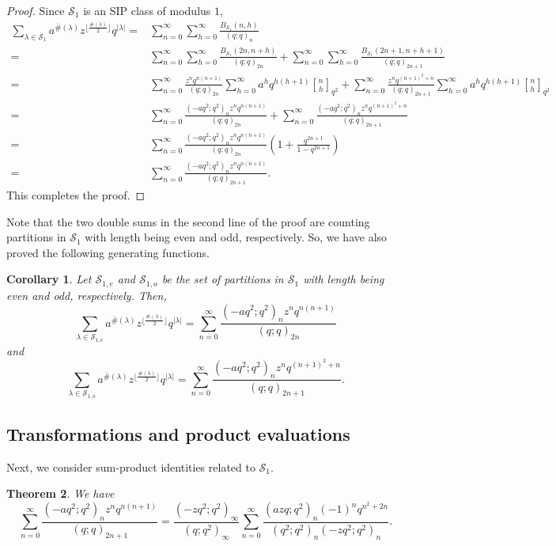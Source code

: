 \documentclass[11pt]{amsart}
\newtheorem{theorem}{Theorem}[section]
\newtheorem{cor}[theorem]{Corollary}
\theoremstyle{definition}
\theoremstyle{remark}
\numberwithin{equation}{section}
\begin{document}
\begin{proof}
Since $\mathcal{S}_1$ is an SIP class of modulus $1$,
\begin{align*}
\sum_{\lambda\in\mathcal{S}_1}a^{\overline{\#}(\lambda)}z^{\lfloor\frac{\#(\lambda)}{2}\rfloor}q^{|\lambda|}=&\sum_{n=0}^{\infty}\sum_{h=0}^{\infty}\frac{B_{\mathcal S_1}(n,h)}{(q;q)_{n}}\\
=&\sum_{n=0}^{\infty}\sum_{h=0}^{\infty}\frac{B_{\mathcal S_1}(2n,n+h)}{(q;q)_{2n}}+\sum_{n=0}^{\infty}\sum_{h=0}^{\infty}\frac{B_{\mathcal S_1}(2n+1,n+h+1)}{(q;q)_{2n+1}}\\
=&\sum_{n=0}^{\infty}\frac{z^nq^{n(n+1)}}{(q;q)_{2n}}\sum_{h=0}^{\infty}a^hq^{h(h+1)}{n\brack h}_{q^2}+\sum_{n=0}^{\infty}\frac{z^nq^{(n+1)^2+n}}{(q;q)_{2n+1}}\sum_{h=0}^{\infty}a^hq^{h(h+1)}{n\brack h}_{q^2}\\
=&\sum_{n=0}^{\infty}\frac{(-aq^2;q^2)_{n}z^nq^{n(n+1)}}{(q;q)_{2n}}+\sum_{n=0}^{\infty}\frac{(-aq^2;q^2)_{n}z^nq^{(n+1)^2+n}}{(q;q)_{2n+1}}\\
=&\sum_{n=0}^{\infty}\frac{(-aq^2;q^2)_{n}z^nq^{n(n+1)}}{(q;q)_{2n}}\left(1+\frac{q^{2n+1}}{1-q^{2n+1}}\right)\\
=&\sum_{n=0}^{\infty}\frac{(-aq^2;q^2)_{n}z^nq^{n(n+1)}}{(q;q)_{2n+1}}.
\end{align*}
This completes the proof.
\end{proof}
Note that the two double sums in the second line of the proof are counting partitions in $\mathcal{S}_1$ with length being even and odd, respectively. So, we have also proved the following generating functions.
\begin{cor}\label{cor:S1-evenodd}
Let $\mathcal{S}_{1,e}$ and $\mathcal{S}_{1,o}$ be the set of partitions in $\mathcal{S}_{1}$ with length being even and odd, respectively. Then,
\begin{equation}
\sum_{\lambda\in\mathcal{S}_{1,e}}a^{\overline{\#}(\lambda)}z^{\lfloor\frac{\#(\lambda)}{2}\rfloor}q^{|\lambda|}=\sum_{n=0}^{\infty}\frac{(-aq^2;q^2)_{n}z^nq^{n(n+1)}}{(q;q)_{2n}}
\end{equation}
and
\begin{equation}
\sum_{\lambda\in\mathcal{S}_{1,o}}a^{\overline{\#}(\lambda)}z^{\lfloor\frac{\#(\lambda)}{2}\rfloor}q^{|\lambda|}=\sum_{n=0}^{\infty}\frac{(-aq^2;q^2)_{n}z^nq^{(n+1)^2+n}}{(q;q)_{2n+1}}.
\end{equation}
\end{cor}

\subsection{Transformations and product evaluations}
Next, we consider sum-product identities related to $\mathcal{S}_1$.
\begin{theorem} We have
\begin{equation}
\sum_{n=0}^{\infty}\frac{(-aq^2;q^2)_{n}z^nq^{n(n+1)}}{(q;q)_{2n+1}}=\frac{(-zq^2;q^2)_{\infty}}{(q;q^2)_{\infty}}\sum_{n=0}^{\infty}\frac{(azq;q^2)_n(-1)^nq^{n^2+2n}}{(q^2;q^2)_n(-zq^2;q^2)_n}.\label{eq:azeq28}
\end{equation}
\end{theorem}
\end{document}
